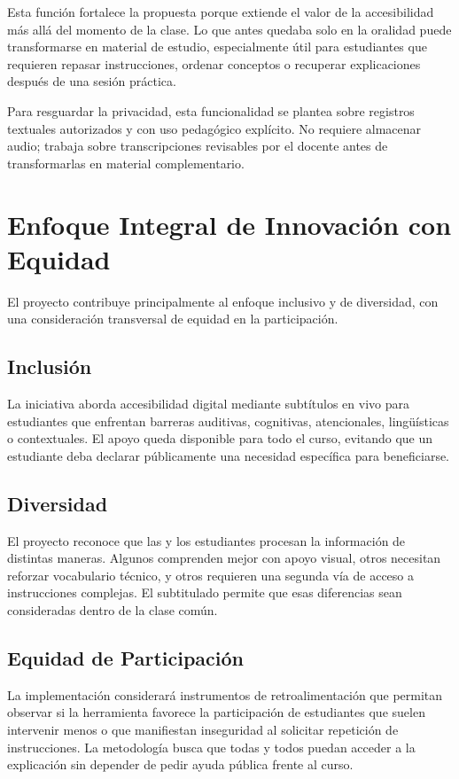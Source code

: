 \documentclass[11pt,letterpaper]{article}
\begin{document}
Esta función fortalece la propuesta porque extiende el valor de la accesibilidad más allá del momento de la clase. Lo que antes quedaba solo en la oralidad puede transformarse en material de estudio, especialmente útil para estudiantes que requieren repasar instrucciones, ordenar conceptos o recuperar explicaciones después de una sesión práctica.

Para resguardar la privacidad, esta funcionalidad se plantea sobre registros textuales autorizados y con uso pedagógico explícito. No requiere almacenar audio; trabaja sobre transcripciones revisables por el docente antes de transformarlas en material complementario.

\section{Enfoque Integral de Innovación con Equidad}

El proyecto contribuye principalmente al enfoque inclusivo y de diversidad, con una consideración transversal de equidad en la participación.

\subsection{Inclusión}

La iniciativa aborda accesibilidad digital mediante subtítulos en vivo para estudiantes que enfrentan barreras auditivas, cognitivas, atencionales, lingüísticas o contextuales. El apoyo queda disponible para todo el curso, evitando que un estudiante deba declarar públicamente una necesidad específica para beneficiarse.

\subsection{Diversidad}

El proyecto reconoce que las y los estudiantes procesan la información de distintas maneras. Algunos comprenden mejor con apoyo visual, otros necesitan reforzar vocabulario técnico, y otros requieren una segunda vía de acceso a instrucciones complejas. El subtitulado permite que esas diferencias sean consideradas dentro de la clase común.

\subsection{Equidad de Participación}

La implementación considerará instrumentos de retroalimentación que permitan observar si la herramienta favorece la participación de estudiantes que suelen intervenir menos o que manifiestan inseguridad al solicitar repetición de instrucciones. La metodología busca que todas y todos puedan acceder a la explicación sin depender de pedir ayuda pública frente al curso.
\end{document}
